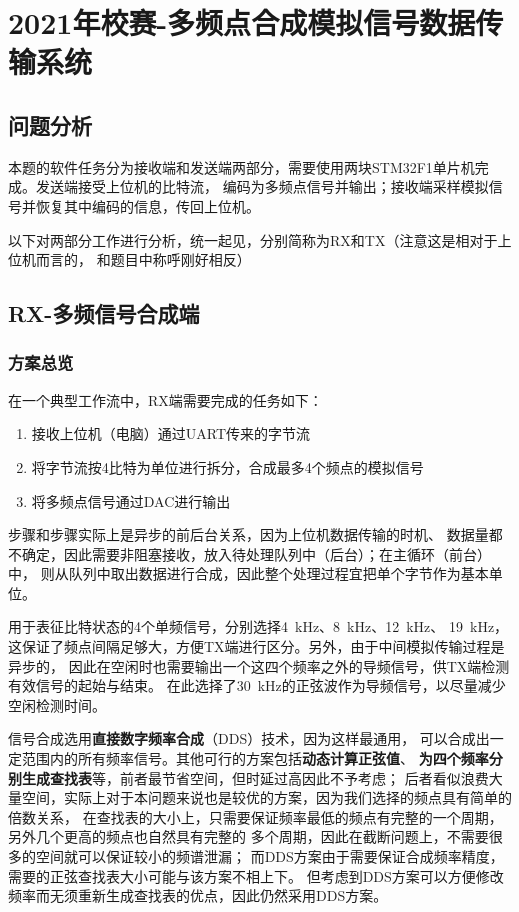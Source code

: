 \section{2021年校赛-多频点合成模拟信号数据传输系统}
\subsection{问题分析}
本题的软件任务分为接收端和发送端两部分，需要使用两块STM32F1单片机完成。发送端接受上位机的比特流，
编码为多频点信号并输出；接收端采样模拟信号并恢复其中编码的信息，传回上位机。

以下对两部分工作进行分析，统一起见，分别简称为RX和TX（注意这是相对于上位机而言的，
和题目中称呼刚好相反）

\subsection{RX-多频信号合成端}
\subsubsection{方案总览}
在一个典型工作流中，RX端需要完成的任务如下：

\begin{enumerate}
  \item \label{itm:rx-1} 接收上位机（电脑）通过UART传来的字节流
  \item \label{itm:rx-2} 将字节流按4比特为单位进行拆分，合成最多4个频点的模拟信号
  \item \label{itm:rx-3} 将多频点信号通过DAC进行输出
\end{enumerate}

步骤和步骤实际上是异步的前后台关系，因为上位机数据传输的时机、
数据量都不确定，因此需要非阻塞接收，放入待处理队列中（后台）；在主循环（前台）中，
则从队列中取出数据进行合成，因此整个处理过程宜把单个字节作为基本单位。

用于表征比特状态的4个单频信号，分别选择\SI{4}{kHz}、\SI{8}{kHz}、\SI{12}{kHz}、
\SI{19}{kHz}，这保证了频点间隔足够大，方便TX端进行区分。另外，由于中间模拟传输过程是异步的，
因此在空闲时也需要输出一个这四个频率之外的导频信号，供TX端检测有效信号的起始与结束。
在此选择了\SI{30}{kHz}的正弦波作为导频信号，以尽量减少空闲检测时间。

信号合成选用\textbf{直接数字频率合成}（DDS）技术，因为这样最通用，
可以合成出一定范围内的所有频率信号。其他可行的方案包括\textbf{动态计算正弦值}、
\textbf{为四个频率分别生成查找表}等，前者最节省空间，但时延过高因此不予考虑；
后者看似浪费大量空间，实际上对于本问题来说也是较优的方案，因为我们选择的频点具有简单的倍数关系，
在查找表的大小上，只需要保证频率最低的频点有完整的一个周期，另外几个更高的频点也自然具有完整的
多个周期，因此在截断问题上，不需要很多的空间就可以保证较小的频谱泄漏；
而DDS方案由于需要保证合成频率精度，需要的正弦查找表大小可能与该方案不相上下。
但考虑到DDS方案可以方便修改频率而无须重新生成查找表的优点，因此仍然采用DDS方案。

